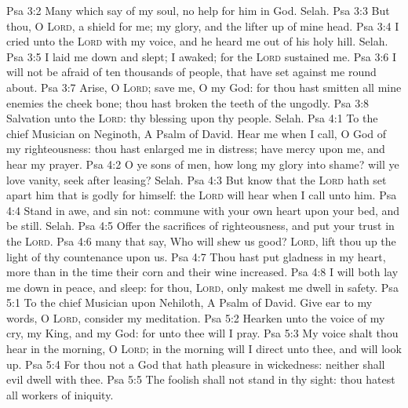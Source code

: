 \vs Psa 3:2 Many  which say of my soul,  no help for him in God. Selah.
\vs Psa 3:3 But thou, O \textsc{Lord},  a shield for me; my glory, and the lifter up of mine head.
\vs Psa 3:4 I cried unto the \textsc{Lord} with my voice, and he heard me out of his holy hill. Selah.
\vs Psa 3:5 I laid me down and slept; I awaked; for the \textsc{Lord} sustained me.
\vs Psa 3:6 I will not be afraid of ten thousands of people, that have set  against me round about.
\vs Psa 3:7 Arise, O \textsc{Lord}; save me, O my God: for thou hast smitten all mine enemies  the cheek bone; thou hast broken the teeth of the ungodly.
\vs Psa 3:8 Salvation  unto the \textsc{Lord}: thy blessing  upon thy people. Selah.
\vs Psa 4:1 To the chief Musician on Neginoth, A Psalm of David. Hear me when I call, O God of my righteousness: thou hast enlarged me  in distress; have mercy upon me, and hear my prayer.
\vs Psa 4:2 O ye sons of men, how long  my glory into shame?  will ye love vanity,  seek after leasing? Selah.
\vs Psa 4:3 But know that the \textsc{Lord} hath set apart him that is godly for himself: the \textsc{Lord} will hear when I call unto him.
\vs Psa 4:4 Stand in awe, and sin not: commune with your own heart upon your bed, and be still. Selah.
\vs Psa 4:5 Offer the sacrifices of righteousness, and put your trust in the \textsc{Lord}.
\vs Psa 4:6  many that say, Who will shew us  good? \textsc{Lord}, lift thou up the light of thy countenance upon us.
\vs Psa 4:7 Thou hast put gladness in my heart, more than in the time  their corn and their wine increased.
\vs Psa 4:8 I will both lay me down in peace, and sleep: for thou, \textsc{Lord}, only makest me dwell in safety.
\vs Psa 5:1 To the chief Musician upon Nehiloth, A Psalm of David. Give ear to my words, O \textsc{Lord}, consider my meditation.
\vs Psa 5:2 Hearken unto the voice of my cry, my King, and my God: for unto thee will I pray.
\vs Psa 5:3 My voice shalt thou hear in the morning, O \textsc{Lord}; in the morning will I direct  unto thee, and will look up.
\vs Psa 5:4 For thou  not a God that hath pleasure in wickedness: neither shall evil dwell with thee.
\vs Psa 5:5 The foolish shall not stand in thy sight: thou hatest all workers of iniquity.
